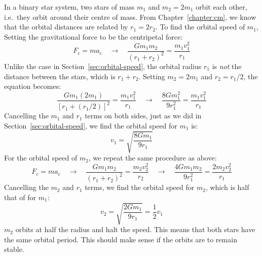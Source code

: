 \begin{example}%
  In a binary star system, two stars of mass $m_1$ and $m_2=2m_1$ orbit each
  other, i.e.\ they orbit around their centre of mass. From
  Chapter~\ref{chapter:cm}, we know that the orbital distances are related by
  $r_1=2r_2$. To find the orbital speed of $m_1$, Setting the gravitational
  force to be the centripetal force:
  \begin{equation*}
    F_c=ma_c
    \quad\to\quad
    \frac{Gm_1m_2}{(r_1+r_2)^2}=\frac{m_1v_1^2}{r_1}
  \end{equation*}
  Unlike the case in Section~\ref{sec:orbital-speed}, the orbital radius $r_1$
  is \emph{not} the distance between the stars, which is $r_1+r_2$. Setting
  $m_2=2m_1$ and $r_2=r_1/2$, the equation becomes:
  \begin{equation*}
    \frac{Gm_1(2m_1)}{[r_1+(r_1/2)]^2}=\frac{m_1v_1^2}{r_1}
    \quad\to\quad
    \frac{8Gm_1^2}{9r_1^2}=\frac{m_1v_1^2}{r_1}
  \end{equation*}
  Cancelling the $m_1$ and $r_1$ terms on both sides, just as we did in
  Section~\ref{sec:orbital-speed}, we find the orbital speed for $m_1$ is:
  \begin{equation*}
    v_1=\sqrt{\frac{8Gm_1}{9r_1}}
  \end{equation*}
  For the orbital speed of $m_2$, we repeat the same procedure as above:
  \begin{equation*}
    F_c=ma_c
    \quad\to\quad
    \frac{Gm_1m_2}{(r_1+r_2)^2}=\frac{m_2v_2^2}{r_2}
    \quad\to\quad
    \frac{4Gm_1m_2}{9r_1^2}=\frac{2m_2v_2^2}{r_1}
  \end{equation*}
  Cancelling the $m_2$ and $r_1$ terms, we find the orbital speed for $m_2$,
  which is half that of for $m_1$:
  \begin{equation*}
    v_2=\sqrt{\frac{2Gm_1}{9r_1}}=\frac12v_1
  \end{equation*}
  $m_2$ orbits at half the radius and halt the speed. This means that both
  stars have the same orbital period. This should make sense if the orbits are
  to remain stable.
\end{example}




